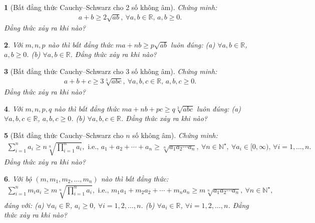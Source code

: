 \documentclass{article}
\newtheorem{baitoan}{}
\begin{document}
\begin{baitoan}[Bất đẳng thức Cauchy--Schwarz cho 2 số không âm]
	Chứng minh:
	\begin{align*}
		\boxed{a + b\ge2\sqrt{ab},\ \forall a,b\in\mathbb{R},\,a,b\ge 0.}
	\end{align*}
	Đẳng thức xảy ra khi nào?
\end{baitoan}

\begin{baitoan}
	Với $m,n,p$ nào thì bất đẳng thức $ma + nb\ge p\sqrt{ab}$ luôn đúng: (a) $\forall a,b\in\mathbb{R}$, $a,b\ge0$. (b) $\forall a,b\in\mathbb{R}$. Đẳng thức xảy ra khi nào?
\end{baitoan}

\begin{baitoan}[Bất đẳng thức Cauchy--Schwarz cho 3 số không âm]
	Chứng minh:
	\begin{align*}
		\boxed{a + b + c\ge3\sqrt[3]{abc},\ \forall a,b,c\in\mathbb{R},\,a,b,c\ge 0.}
	\end{align*}
	Đẳng thức xảy ra khi nào?
\end{baitoan}

\begin{baitoan}
	Với $m,n,p,q$ nào thì bất đẳng thức $ma + nb + pc\ge q\sqrt[3]{abc}$ luôn đúng: (a) $\forall a,b,c\in\mathbb{R}$, $a,b,c\ge0$. (b) $\forall a,b,c\in\mathbb{R}$. Đẳng thức xảy ra khi nào?
\end{baitoan}

\begin{baitoan}[Bất đẳng thức Cauchy--Schwarz cho $n$ số không âm]
	Chứng minh:
	\begin{align*}
		\sum_{i=1}^n a_i\ge n\sqrt[n]{\prod_{i=1}^n a_i},\mbox{ i.e., } a_1 + a_2 + \cdots + a_n\ge\sqrt[n]{a_1a_2\cdots a_n},\ \forall n\in\mathbb{N}^\star,\ \forall a_i\in[0,\infty),\,\forall i = 1,\ldots,n.
	\end{align*}
	Đẳng thức xảy ra khi nào?
\end{baitoan}

\begin{baitoan}
	Với bộ $(m,m_1,m_2,\ldots,m_n)$ nào thì bất đẳng thức:
	\begin{align*}
		\sum_{i=1}^n m_ia_i\ge m\sqrt[n]{\prod_{i=1}^n a_i},\mbox{ i.e., } m_1a_1 + m_2a_2 + \cdots + m_na_n\ge m\sqrt[n]{a_1a_2\cdots a_n},\ \forall n\in\mathbb{N}^\star,
	\end{align*}
	đúng với: (a) $\forall a_i\in\mathbb{R}$, $a_i\ge0$, $\forall i = 1,2,\ldots,n$. (b) $\forall a_i\in\mathbb{R}$, $\forall i = 1,2,\ldots,n$.
	Đẳng thức xảy ra khi nào?
\end{baitoan}
\end{document}

